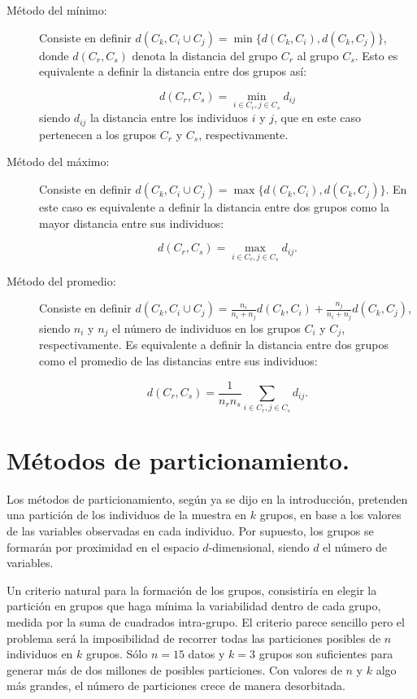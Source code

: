 \documentclass[
  a4paper,
  oneside]{scrbook}
\theoremstyle{definition}
\theoremstyle{definition}
\theoremstyle{definition}
\theoremstyle{definition}
\theoremstyle{remark}
\begin{document}
\begin{description}
\item[Método del mínimo:]
Consiste en definir
\(d(C_k,C_i\cup C_j)=\min\{d(C_k,C_i),d(C_k,C_j)\}\), donde
\(d(C_r,C_s)\) denota la distancia del grupo \(C_r\) al grupo \(C_s\).
Esto es equivalente a definir la distancia entre dos grupos así:

\[d(C_r,C_s)=\min_{i\in C_r, j\in C_s} d_{ij}\] siendo \(d_{ij}\) la
distancia entre los individuos \(i\) y \(j\), que en este caso
pertenecen a los grupos \(C_r\) y \(C_s\), respectivamente.
\item[Método del máximo:]
Consiste en definir
\(d(C_k,C_i\cup C_j)=\max\{d(C_k,C_i),d(C_k,C_j)\}\). En este caso es
equivalente a definir la distancia entre dos grupos como la mayor
distancia entre sus individuos:

\[d(C_r,C_s)=\max_{i\in C_r, j\in C_s} d_{ij}.\]
\item[Método del promedio:]
Consiste en definir
\(d(C_k,C_i\cup C_j)=\frac{n_i}{n_i+n_j} d(C_k,C_i)+ \frac{n_j}{n_i+n_j} d(C_k,C_j)\),
siendo \(n_i\) y \(n_j\) el número de individuos en los grupos \(C_i\) y
\(C_j\), respectivamente. Es equivalente a definir la distancia entre
dos grupos como el promedio de las distancias entre sus individuos:

\[d(C_r,C_s)=\frac{1}{n_r n_s}  \sum_{i\in C_r, j\in C_s} d_{ij}.\]
\end{description}

\section{Métodos de particionamiento.}\label{metodos-de-particionamiento}

Los métodos de particionamiento, según ya se dijo en la introducción,
pretenden una partición de los individuos de la muestra en \(k\) grupos,
en base a los valores de las variables observadas en cada individuo. Por
supuesto, los grupos se formarán por proximidad en el espacio
\(d\)-dimensional, siendo \(d\) el número de variables.

Un criterio natural para la formación de los grupos, consistiría en
elegir la partición en grupos que haga mínima la variabilidad dentro de
cada grupo, medida por la suma de cuadrados intra-grupo. El criterio
parece sencillo pero el problema será la imposibilidad de recorrer todas
las particiones posibles de \(n\) individuos en \(k\) grupos. Sólo \(n=15\)
datos y \(k=3\) grupos son suficientes para generar más de dos millones de
posibles particiones. Con valores de \(n\) y \(k\) algo más grandes, el
número de particiones crece de manera desorbitada.
\end{document}
